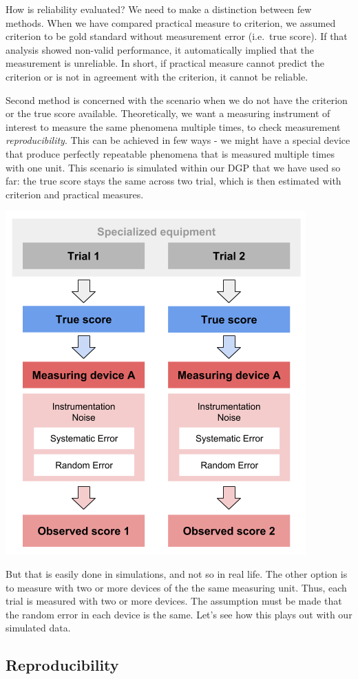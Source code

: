\documentclass[
]{book}
\begin{document}
How is reliability evaluated? We need to make a distinction between few methods. When we have compared practical measure to criterion, we assumed criterion to be gold standard without measurement error (i.e.~true score). If that analysis showed non-valid performance, it automatically implied that the measurement is unreliable. In short, if practical measure cannot predict the criterion or is not in agreement with the criterion, it cannot be reliable.

Second method is concerned with the scenario when we do not have the criterion or the true score available. Theoretically, we want a measuring instrument of interest to measure the same phenomena multiple times, to check measurement \emph{reproducibility}. This can be achieved in few ways - we might have a special device that produce perfectly repeatable phenomena that is measured multiple times with one unit. This scenario is simulated within our DGP that we have used so far: the true score stays the same across two trial, which is then estimated with criterion and practical measures.

\begin{center}\includegraphics[width=0.5\linewidth]{figures/reproducibility} \end{center}

But that is easily done in simulations, and not so in real life. The other option is to measure with two or more devices of the the same measuring unit. Thus, each trial is measured with two or more devices. The assumption must be made that the random error in each device is the same. Let's see how this plays out with our simulated data.

\hypertarget{reproducibility}{%
\subsection{Reproducibility}\label{reproducibility}}
\end{document}
